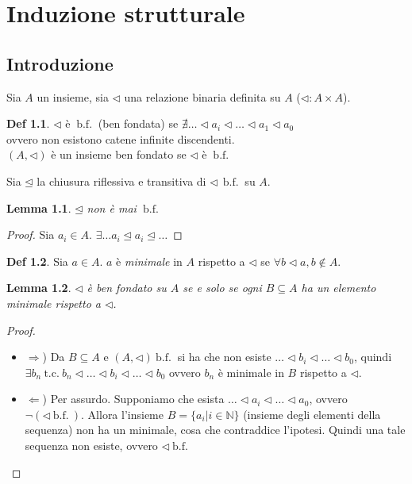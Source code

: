 \documentclass[a4paper]{report}
\newcommand{\bnfn}{\ \mathrm{b.f.}\ }
\newcommand{\sse}{se e solo se}
\newcommand{\tc}{\ \mathrm{t.c.}\ }
\theoremstyle{definition} \newtheorem*{defi}{Def}
\theoremstyle{plain} \newtheorem{lemma}{Lemma}
\theoremstyle{plain} \newtheorem{teo}{Teorema}
\theoremstyle{remark} \newtheorem*{es}{Esempio}
\begin{document}
\chapter{Induzione strutturale}
\section*{Introduzione}
Sia $A$ un insieme, sia $\lhd$ una relazione binaria definita su $A$
($\lhd : A \times A$).
\begin{defi}
  $\lhd$ è $\bnfn$ (ben fondata) se $\nexists \ldots \lhd a_i \lhd \ldots \lhd a_1 \lhd a_0$
  \\
  ovvero non esistono catene infinite discendenti.
  \\
  $(A, \lhd)$ è un insieme ben fondato se $\lhd$ è $\bnfn$
\end{defi}
Sia $\unlhd$ la chiusura riflessiva e transitiva di $\lhd \ \bnfn$ su $A$.
\begin{lemma}
  $\unlhd$ non è mai $\bnfn$
\end{lemma}
\begin{proof}
  Sia $a_i \in A$. $\exists \ldots a_i \unlhd a_i \unlhd \ldots$ \qedhere
\end{proof}
\begin{defi}
  Sia $a \in A$. $a$ è \emph{minimale} in $A$ rispetto a $\lhd$ se
  $\forall b \lhd a, b \not\in A$.
\end{defi}
\begin{lemma}
  \label{lemma:2}
  $\lhd$ è ben fondato su $A$ \sse{} ogni $B \subseteq A$ ha un elemento
  minimale rispetto a $\lhd$.
\end{lemma}
\begin{proof}
  \begin{itemize}
    \item{$\Rightarrow$)} Da $ B \subseteq A$ e $(A, \lhd) \bnfn$ si ha che
      non esiste $\ldots \lhd b_i \lhd \ldots \lhd b_0$, quindi
      $\exists b_n \tc b_n \lhd \ldots \lhd b_i \lhd \ldots \lhd b_0$
      ovvero $b_n$ è minimale in $B$ rispetto a $\lhd$.
    \item{$\Leftarrow$)} Per assurdo. Supponiamo che esista
      $\ldots \lhd a_i \lhd \ldots \lhd a_0$, ovvero $\neg (\lhd \bnfn)$.
      Allora l'insieme $B=\{a_i|i\in\mathbb{N}\}$ (insieme degli elementi
      della sequenza) non ha un minimale, cosa che contraddice l'ipotesi.
      Quindi una tale sequenza non esiste, ovvero $\lhd \bnfn$
  \end{itemize}
\end{proof}
\newpage
\end{document}
